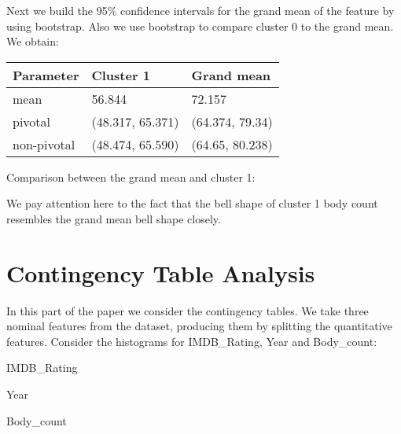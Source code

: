 \documentclass[a4paper,14pt]{article}
\begin{document}
Next we build the 95\% confidence intervals for the grand mean of the feature by using bootstrap. Also we use bootstrap to compare cluster 0 to the grand mean.  We obtain:


\begin{center}
	\begin{tabular}{|l|l|l|}
		\hline
		\textbf{Parameter} & \textbf{Cluster 1}  & \textbf{Grand mean}  \\ \hline
		mean & 56.844 & 72.157 \\ \hline
		pivotal & (48.317, 65.371) & (64.374, 79.34)  \\ \hline
		non-pivotal & (48.474, 65.590)  & (64.65, 80.238)  \\ \hline
	\end{tabular}
\end{center}

\normalsize

Comparison between the grand mean and cluster 1:
    \begin{center}
\end{center}
We pay attention here to the fact that the bell shape of cluster 1 body count resembles the grand mean bell shape closely.



    \section{Contingency Table Analysis}
    
In this part of the paper we consider the contingency tables. We take three nominal features from the dataset, producing them by splitting the quantitative features. Consider the histograms for IMDB\_Rating, Year and Body\_count:

\begin{multicols}{2}
    \begin{center}
	IMDB\_Rating
\end{center}
\begin{center}
	Year
\end{center}
    \begin{center}
	 Body\_count
\end{center}

\end{multicols}
\end{document}
